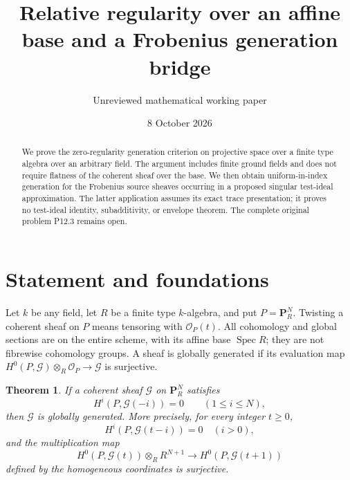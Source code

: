 \documentclass[11pt]{article}
\title{Relative regularity over an affine base and a Frobenius generation bridge}
\author{Unreviewed mathematical working paper}
\date{8 October 2026}
\newtheorem{theorem}{Theorem}
\newcommand{\OO}{\mathcal O}
\newcommand{\GG}{\mathcal G}
\begin{document}
\maketitle
\begin{abstract}
We prove the zero-regularity generation criterion on projective space over
a finite type algebra over an arbitrary field. The argument includes
finite ground fields and does not require flatness of the coherent sheaf
over the base. We then obtain uniform-in-index generation for the
Frobenius source sheaves occurring in a proposed singular test-ideal
approximation. The latter application assumes its exact trace presentation;
it proves no test-ideal identity, subadditivity, or envelope theorem.
The complete original problem P12.3 remains open.
\end{abstract}

\section{Statement and foundations}
Let $k$ be any field, let $R$ be a finite type $k$-algebra, and put
$P=\mathbf P^N_R$. Twisting a coherent sheaf on $P$ means tensoring
with $\OO_P(t)$. All cohomology and global sections are on the entire
scheme, with its affine base $\operatorname{Spec}R$; they are not fibrewise
cohomology groups. A sheaf is globally generated if its evaluation map
$H^0(P,\GG)\otimes_R\OO_P\longrightarrow\GG$ is surjective.

\begin{theorem}\label{thm:relative}
If a coherent sheaf $\GG$ on $\mathbf P^N_R$ satisfies
\[
 H^i(P,\GG(-i))=0\qquad(1\leq i\leq N),
\]
then $\GG$ is globally generated. More precisely, for every integer
$t\geq0$,
\[
 H^i(P,\GG(t-i))=0\quad(i>0),
\]
and the multiplication map
\[
 H^0(P,\GG(t))\otimes_R R^{N+1}\longrightarrow
 H^0(P,\GG(t+1))
\]
defined by the homogeneous coordinates is surjective.
\end{theorem}
\end{document}
